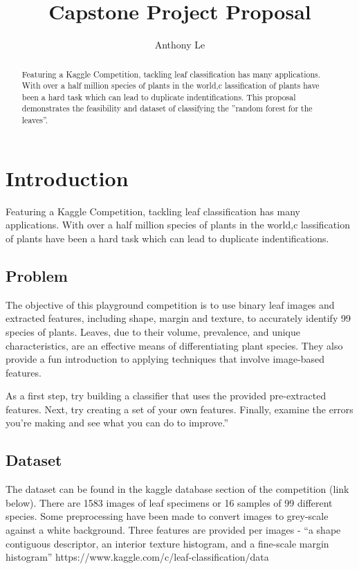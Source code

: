 \documentclass{article}
\begin{document}
\title{Capstone Project Proposal}
\author{Anthony Le}

\maketitle

\begin{abstract}
Featuring a Kaggle Competition, tackling leaf classification has many applications. With over a half million species of plants in the world,c lassification of plants have been a hard task which can lead to duplicate indentifications. This proposal demonstrates the feasibility and dataset of classifying the ''random forest for the leaves''.
\end{abstract}

\section{Introduction}
Featuring a Kaggle Competition, tackling leaf classification has many applications. With over a half million species of plants in the world,c lassification of plants have been a hard task which can lead to duplicate indentifications.

\subsection{Problem}
The objective of this playground competition is to use binary leaf images and extracted features, including shape, margin and texture, to accurately identify 99 species of plants. Leaves, due to their volume, prevalence, and unique characteristics, are an effective means of differentiating plant species. They also provide a fun introduction to applying techniques that involve image-based features.

As a first step, try building a classifier that uses the provided pre-extracted features. Next, try creating a set of your own features. Finally, examine the errors you're making and see what you can do to improve.''

\subsection{Dataset}
The dataset can be found in the kaggle database section of the competition (link below). There are 1583 images of leaf specimens or 16 samples of 99 different species.  Some preprocessing have been made to convert images to grey-scale against a white background. Three features are provided per images - ``a shape contiguous descriptor, an interior texture histogram, and a ﬁne-scale margin histogram''
 https://www.kaggle.com/c/leaf-classification/data 
\end{document}

